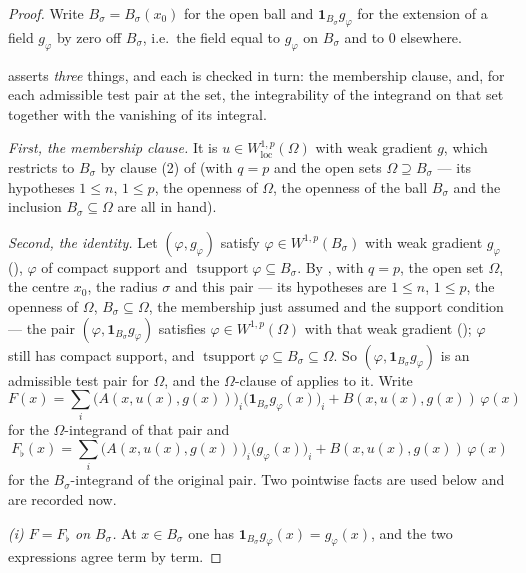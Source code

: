 \begin{proof}
Write $B_\sigma=B_\sigma(x_0)$ for the open ball and $\mathbf1_{B_\sigma}g_\varphi$
for the extension of a field $g_\varphi$ by zero off $B_\sigma$, i.e.\ the field
equal to $g_\varphi$ on $B_\sigma$ and to $0$ elsewhere.

 asserts \emph{three} things, and each is checked in
turn: the membership clause, and, for each admissible test pair at the set, the
integrability of the integrand on that set together with the vanishing of its
integral.

\emph{First, the membership clause.}  It is $u\in W^{1,p}_{\mathrm{loc}}(\Omega)$
with weak gradient $g$, which restricts to $B_\sigma$ by clause (2) of
 (with $q=p$ and the open sets
$\Omega\supseteq B_\sigma$ --- its hypotheses $1\le n$, $1\le p$, the openness of
$\Omega$, the openness of the ball $B_\sigma$ and the inclusion
$B_\sigma\subseteq\Omega$ are all in hand).

\emph{Second, the identity.}  Let $(\varphi,g_\varphi)$ satisfy
$\varphi\in W^{1,p}(B_\sigma)$ with weak gradient $g_\varphi$
(), $\varphi$ of compact support and
$\operatorname{tsupport}\varphi\subseteq B_\sigma$.  By
, with $q=p$, the open set $\Omega$, the centre
$x_0$, the radius $\sigma$ and this pair --- its hypotheses are $1\le n$,
$1\le p$, the openness of $\Omega$, $B_\sigma\subseteq\Omega$, the membership
just assumed and the support condition --- the pair
$(\varphi,\mathbf1_{B_\sigma}g_\varphi)$ satisfies
$\varphi\in W^{1,p}(\Omega)$ with that weak gradient
(); $\varphi$ still has compact support, and
$\operatorname{tsupport}\varphi\subseteq B_\sigma\subseteq\Omega$.  So
$(\varphi,\mathbf1_{B_\sigma}g_\varphi)$ is an admissible test pair for
$\Omega$, and the $\Omega$-clause of  applies to it.
Write
\[
F(x)=\sum_i\bigl(A(x,u(x),g(x))\bigr)_i
      \bigl(\mathbf1_{B_\sigma}g_\varphi(x)\bigr)_i
      +B(x,u(x),g(x))\,\varphi(x)
\]
for the $\Omega$-integrand of that pair and
\[
F_\flat(x)=\sum_i\bigl(A(x,u(x),g(x))\bigr)_i\bigl(g_\varphi(x)\bigr)_i
      +B(x,u(x),g(x))\,\varphi(x)
\]
for the $B_\sigma$-integrand of the original pair.  Two pointwise facts are used
below and are recorded now.

\emph{(i) $F=F_\flat$ on $B_\sigma$.}  At $x\in B_\sigma$ one has
$\mathbf1_{B_\sigma}g_\varphi(x)=g_\varphi(x)$, and the two expressions agree
term by term.


\end{proof}
